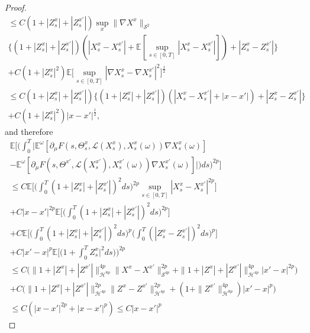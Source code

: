 \documentclass[10pt,a4paper]{amsart}
\newcommand{\E}{\mathbb E}
\newcommand{\Te}{\Theta}
\newcommand{\cH}{\mathcal H}
\newcommand{\cL}{\mathcal L}
\newcommand{\cS}{\mathcal S}
\newcommand{\om}{\omega}
\begin{document}
\begin{proof}
\begin{multline*}
 \le C (1+|Z^x_s|+|Z^{x'}_s|)\sup_x\|\nabla X^x\|_{\cS^2}\\
\{(1+|Z^x_s|+|Z^{x'}_s|)(|X^x_s-X^{x'}_s|+\E[\sup_{s\in[0,T]}|X^x_s-X^{x'}_s|])+|Z^x_s-Z^{x'}_s|\}\\+
C (1+|Z^x_s|^2)\E\big[\sup_{s\in[0,T]}|\nabla X^x_s-\nabla X^{x'}_s|^2\big]^\frac12
 \\
\le C (1+|Z^x_s|+|Z^{x'}_s|) \{(1+|Z^x_s|+|Z^{x'}_s|)(|X^x_s-X^{x'}_s|+|x-x'|)+|Z^x_s-Z^{x'}_s|\}\\
+C(1+|Z^x_s|^2)|x-x'|^\frac12,
\end{multline*}
and therefore
\begin{multline*}
  \E\Big[\Big(\int_0^T\big|\E^\om[\partial_\mu F(s,\Te^x_s,\cL(X^x_s), X^x_s(\om))\nabla X^x_s(\om)]
  \\-\E^\om[\partial_\mu F(s,\Te^{x'},\cL(X^{x'}_s), X^{x'}_s(\om)) \nabla X^{x'}_s(\om)]\big|)ds\Big)^{2p}\Big]\\\le
C  \E\Big[\Big(\int_0^T (1+|Z^x_s|+|Z^{x'}_s|)^2ds\Big)^{2p}\sup_{s\in[0,T]}|X^x_s-X^{x'}_s|^{2p}\Big]\\+C|x-x'|^{2p}\E\Big[\Big(\int_0^T (1+|Z^x_s|+|Z^{x'}_s|)^2ds\Big)^{2p}\Big]\\+C\E\Big[\Big(\int_0^T (1+|Z^x_s|+|Z^{x'}_s|)^2ds\Big)^p\Big(\int_0^T (|Z^x_s-Z^{x'}_s|)^2ds\Big)^p\Big]\\
+C|x'-x|^p\E\Big[\Big(1+\int_0^T Z^x_s|^2ds)\Big)^{2p}\\
\le C \big(
\|1+|Z^x|+|Z^{x'}|\|_{\cH^{8p}}^{4p}\|X^x-X^{x'}\|_{\cS^{4p}}^{2p}+\|1+|Z^x|+|Z^{x'}|\|_{\cH^{4p}}^{4p}|x'-x|^{2p}\big)\\
+ C \big(\|1+|Z^x|+|Z^{x'}|\|_{\cH^{4p}}^{2p}\|Z^x-Z^{x'}\|_{\cH^{4p}}^{2p}+(1+\|Z^{x'}\|_{\cH^{8p}}^{4p})|x'-x|^p\big)\\\le
C(|x-x'|^{2p}+|x-x'|^p)\le C|x-x'|^p
  \end{multline*}
\end{proof}
\end{document}
